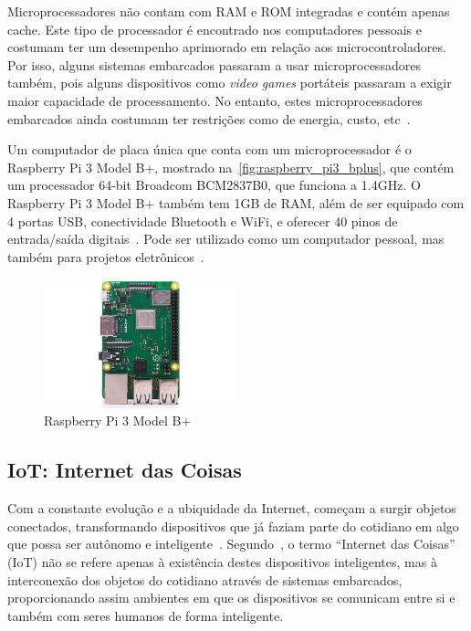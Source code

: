 Microprocessadores não contam com RAM e ROM integradas e contém apenas cache. Este tipo de processador é encontrado nos computadores pessoais e costumam ter um desempenho aprimorado em relação aos microcontroladores. Por isso, alguns sistemas embarcados passaram a usar microprocessadores também, pois alguns dispositivos como \textit{video games} portáteis passaram a exigir maior capacidade de processamento. No entanto, estes microprocessadores embarcados ainda costumam ter restrições como de energia, custo, etc~\cite{schlett:1998}.

Um computador de placa única que conta com um microprocessador é o Raspberry Pi 3 Model B+, mostrado na~\autoref{fig:raspberry_pi3_bplus}, que contém um processador 64-bit Broadcom BCM2837B0, que funciona a 1.4GHz. O Raspberry Pi 3 Model B+ também tem 1GB de RAM, além de ser equipado com 4 portas USB, conectividade Bluetooth e WiFi, e oferecer 40 pinos de entrada/saída digitais~\cite{raspberry:pi3_store}. Pode ser utilizado como um computador pessoal, mas também para projetos eletrônicos~\cite{raspberry:faq}.

\begin{figure}[ht]
	\caption{\label{fig:raspberry_pi3_bplus}Raspberry Pi 3 Model B+}
	\begin{center}
	    \includegraphics[width=0.5\textwidth]{resources/raspberry_pi3_bplus}
	\end{center}
\end{figure}

\subsection{IoT\@: Internet das Coisas}
Com a constante evolução e a ubiquidade da Internet, começam a surgir objetos conectados, transformando dispositivos que já faziam parte do cotidiano em algo que possa ser autônomo e inteligente~\cite{kopetz:2011}.  Segundo~, o termo ``Internet das Coisas'' (IoT)  não se refere apenas à existência destes dispositivos inteligentes, mas à interconexão dos objetos do cotidiano através de sistemas embarcados, proporcionando assim ambientes em que os dispositivos se comunicam entre si e também com seres humanos de forma inteligente.

